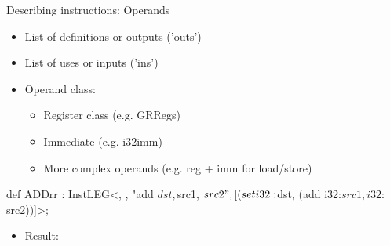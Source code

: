 \begin{frame}[fragile]{Describing instructions: Operands}

\begin{itemize}
    \item List of definitions or outputs ('outs')
    \item List of uses or inputs ('ins')
    \item Operand class:
    \begin{itemize}
        \item Register class (e.g. GRRegs)
        \item Immediate (e.g. i32imm)
        \item More complex operands (e.g. reg + imm for load/store)
    \end{itemize}
\end{itemize}

\begin{codebox}[commandchars=\\\{\}]
def ADDrr : InstLEG<,
                    ,
                    "add $dst, $src1, $src2",
                    [(set i32:$dst, (add i32:$src1, i32:$src2))]>;
\end{codebox}

\vspace{5ex}
\begin{itemize}
    \item Result:
\end{itemize}

\end{frame}


